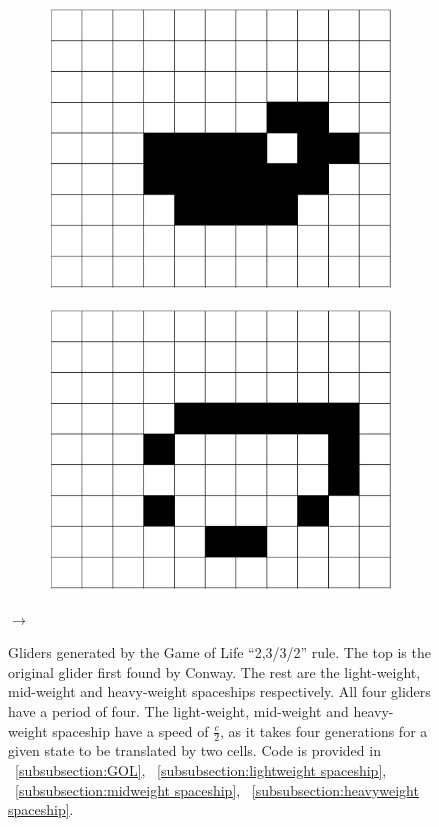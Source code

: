 \documentclass[12pt]{article}
\numberwithin{figure}{section} %
\begin{document}
\begin{figure}[H]
\begin{subfigure}{0.18\textwidth}
     		\centering
     		\includegraphics[width=\linewidth]{Section1/7.3}
     		\subcaption{}
   	\end{subfigure}
   	\begin{subfigure}{0.18\textwidth}
     		\centering
     		\includegraphics[width=\linewidth]{Section1/7.4}
     		\subcaption{}
   	\end{subfigure}
   	{\LARGE$\xrightarrow{}$}
	\caption[Gliders in the Game of Life]{Gliders generated by the Game of Life “2,3/3/2” rule. The top is the original glider first found by Conway. The rest are the light-weight, mid-weight and heavy-weight spaceships respectively. All four gliders have a period of four. The light-weight, mid-weight and heavy-weight spaceship have a speed of $\frac{c}{2}$, as it takes four generations for a given state to be translated by two cells. Code is provided in ~\ref{subsubsection:GOL}, ~\ref{subsubsection:lightweight spaceship}, ~\ref{subsubsection:midweight spaceship}, ~\ref{subsubsection:heavyweight spaceship}.}
	\label{fig:GOL examples}
	\vspace{-1.5em}
\end{figure}
\end{document}
